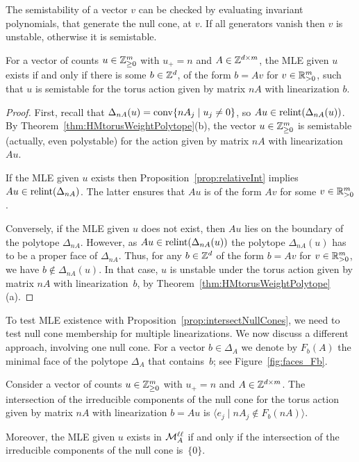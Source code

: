 

The semistability of a vector $v$ can be checked by evaluating invariant polynomials, that generate the null cone, at $v$. If all generators vanish then $v$ is unstable, otherwise it is semistable. %

\begin{prop}
	\label{prop:intersectNullCones}
	For a vector of counts $u \in \mathbb Z^m_{\geq 0}$ with $u_+ = n$  and $A \in \mathbb Z^{d \times m}$, the MLE given $u$ exists if and only if there is some $b \in \mathbb Z^d$, of the form $b = Av$ for $v \in \mathbb R_{>0}^m$, such that $u$ is semistable for the torus action given by matrix $n A$ with linearization $b$. 
\end{prop}

\begin{proof}
	First, recall that $\Delta_{nA}(u) = \operatorname{conv}\{n A_j \mid u_j \neq 0\}$, so $Au \in \operatorname{relint}(\Delta_{nA}(u))$. By Theorem~\ref{thm:HMtorusWeightPolytope}(b), the vector $u \in \mathbb Z_{\geq 0}^m$ is semistable (actually, even polystable) for the action given by matrix $n A$ with linearization $Au$.
	
	If the MLE given $u$ exists then Proposition~\ref{prop:relativeInt} implies $Au \in \operatorname{relint}(\Delta_{nA})$. The latter ensures that $Au$ is of the form $Av$ for some $v \in \mathbb R_{>0}^m$. 
	
	Conversely, if the MLE given $u$ does not exist, then $Au$ lies on the boundary of the polytope $\Delta_{nA}$. However, as $Au \in \operatorname{relint}(\Delta_{nA}(u))$ the polytope $\Delta_{nA}(u)$ has to be a proper face of $\Delta_{nA}$.
	Thus, for any $b \in \mathbb Z^d$ of the form $b = Av$ for  $v \in \mathbb R_{>0}^m$, we have $b \notin \Delta_{nA}(u)$. In that case, $u$ is unstable under the torus action given by matrix $nA$ with linearization~$b$, by Theorem~\ref{thm:HMtorusWeightPolytope}(a).
\end{proof}

To test MLE existence with Proposition~\ref{prop:intersectNullCones}, we need to test null cone membership for multiple linearizations.
We now discuss a different approach, involving one null cone.
For a vector $b \in \Delta_{A}$ we denote by $F_b(A)$ the minimal face of the polytope $\Delta_{A}$ that contains~$b$; see Figure~\ref{fig:faces_Fb}.

\begin{prop}
	\label{prop:intersectIrredComp}
	Consider a vector of counts $u \in \mathbb Z^m_{\geq 0}$ with $u_+ = n$ and $A \in \mathbb Z^{d \times m}$.
	The intersection of the irreducible components of the null cone for the torus action given by matrix $n A$ with linearization $b = Au$
	is $\langle e_j \mid  n A_j \notin F_b(nA) \rangle$. 
	
	Moreover, the MLE given $u$ exists in $\mathcal{M}^{\mathtt{\ell \ell}}_A$ if and only if the intersection of the irreducible components of the null cone is~$\lbrace 0 \rbrace$.
\end{prop}

